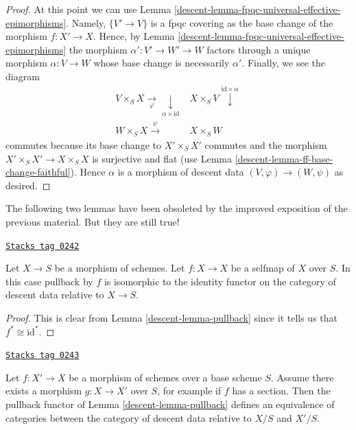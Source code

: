 \begin{proof}
\medskip\noindent
At this point we can use
Lemma \ref{descent-lemma-fpqc-universal-effective-epimorphisms}.
Namely, $\{V' \to V\}$ is a fpqc covering as
the base change of the morphism $f : X' \to X$.
Hence, by
Lemma \ref{descent-lemma-fpqc-universal-effective-epimorphisms}
the morphism $\alpha' : V' \to W' \to W$ factors through
a unique morphism $\alpha : V \to W$ whose base change is
necessarily $\alpha'$. Finally, we see the diagram
$$
\begin{array}{cc}V \times_S X \underset{\varphi}{\longrightarrow}\underset{\alpha \times \text{id}}{\downarrow} & X \times_S V \overset{\text{id} \times \alpha}{\downarrow} \\ W \times_S X \overset{\psi}{\longrightarrow} & X \times_S W\end{array}
$$
commutes because its base change to $X' \times_S X'$
commutes and the morphism $X' \times_S X' \to X \times_S X$
is surjective and flat (use Lemma \ref{descent-lemma-ff-base-change-faithful}).
Hence $\alpha$ is a morphism of descent data
$(V, \varphi) \to (W, \psi)$ as desired.
\end{proof}

The following two lemmas have been obsoleted by the improved
exposition of the previous material. But they are still true!

\begin{lemma}
\label{descent-lemma-pullback-selfmap}
\href{https://stacks.math.columbia.edu/tag/0242}{\texttt{Stacks tag 0242}}

Let $X \to S$ be a morphism of schemes.
Let $f : X \to X$ be a selfmap of $X$ over $S$.
In this case pullback by $f$ is isomorphic to the
identity functor on the category of descent data
relative to $X \to S$.
\end{lemma}

\begin{proof}

This is clear from Lemma \ref{descent-lemma-pullback} since it tells us that
$f^* \cong \text{id}^*$.
\end{proof}

\begin{lemma}
\label{descent-lemma-morphism-with-section-equivalence}
\href{https://stacks.math.columbia.edu/tag/0243}{\texttt{Stacks tag 0243}}

Let $f : X' \to X$ be a morphism of schemes over a base scheme $S$.
Assume there exists a morphism $g : X \to X'$ over $S$, for example
if $f$ has a section. Then the pullback functor
of Lemma \ref{descent-lemma-pullback} defines an equivalence of
categories between the category of descent data relative to
$X/S$ and $X'/S$.
\end{lemma}

